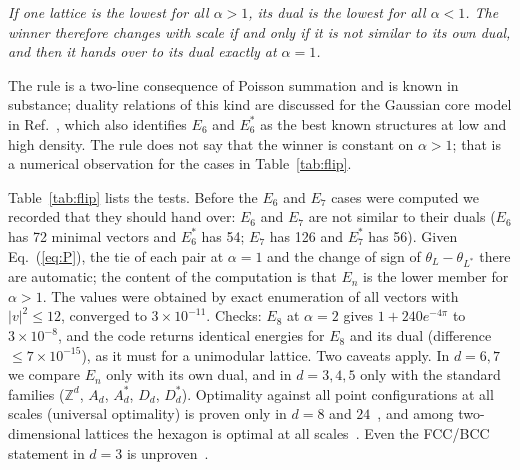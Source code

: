 \documentclass[aps,prd,twocolumn,superscriptaddress,nofootinbib,showkeys]{revtex4-2}
\begin{document}
\emph{If one lattice is the lowest for all $\alpha>1$, its dual is the lowest for all $\alpha<1$. The winner therefore changes with scale if and only if it is not similar to its own dual, and then it hands over to its dual exactly at $\alpha=1$.}

The rule is a two-line consequence of Poisson summation and is known in substance; duality relations of this kind are discussed for the Gaussian core model in Ref.~\cite{CKS}, which also identifies $E_6$ and $E_6^*$ as the best known structures at low and high density. The rule does not say that the winner is constant on $\alpha>1$; that is a numerical observation for the cases in Table~\ref{tab:flip}.

Table~\ref{tab:flip} lists the tests. Before the $E_6$ and $E_7$ cases were computed we recorded that they should hand over: $E_6$ and $E_7$ are not similar to their duals ($E_6$ has 72 minimal vectors and $E_6^*$ has 54; $E_7$ has 126 and $E_7^*$ has 56). Given Eq.~(\ref{eq:P}), the tie of each pair at $\alpha=1$ and the change of sign of $\theta_L-\theta_{L^*}$ there are automatic; the content of the computation is that $E_n$ is the lower member for $\alpha>1$. The values were obtained by exact enumeration of all vectors with $|v|^2\le12$, converged to $3\times10^{-11}$. Checks: $E_8$ at $\alpha=2$ gives $1+240e^{-4\pi}$ to $3\times10^{-8}$, and the code returns identical energies for $E_8$ and its dual (difference $\le7\times10^{-15}$), as it must for a unimodular lattice. Two caveats apply. In $d=6,7$ we compare $E_n$ only with its own dual, and in $d=3,4,5$ only with the standard families ($\mathbb Z^d$, $A_d$, $A_d^*$, $D_d$, $D_d^*$). Optimality against all point configurations at all scales (universal optimality) is proven only in $d=8$ and $24$~\cite{CKMRV}, and among two-dimensional lattices the hexagon is optimal at all scales~\cite{Montgomery}. Even the FCC/BCC statement in $d=3$ is unproven~\cite{SS}.
\end{document}

